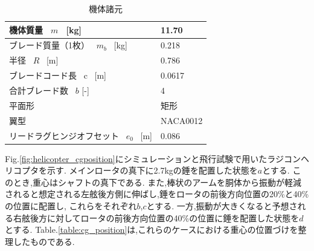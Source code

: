     \begin{table}[H]
        \centering
        \caption{機体諸元}
        \label{table:aircraft_specification}
        \setlength{\tabcolsep}{5pt}
        \begin{tabular}{|l|l|}
            \hline 機体質量 \, $m$ \, [kg] &  11.70 \\
            \hline ブレード質量（1枚） \, $m_b$ \, [kg] &  0.218 \\
            \hline 半径 \, $R$ \, [m] &  0.786 \\
            \hline ブレードコード長 \, c \, [m] & 0.0617 \\
            \hline 合計ブレード数 \, $b$ [-] & 4 \\
            \hline 平面形  & 矩形 \\
            \hline 翼型 & NACA0012 \\
           \hline  リードラグヒンジオフセット \, $e_0$ \, [m] & 0.086 \\
            \hline 
        \end{tabular}
    \end{table}

    \par
    Fig.\ref{fig:helicopter_cgposition}にシミュレーションと飛行試験で用いたラジコンヘリコプタを示す.
    メインロータの真下に2.7kgの錘を配置した状態を$a$とする.
    このとき,重心はシャフトの真下である.
    また,棒状のアームを胴体から振動が軽減されると想定される左舷後方側に伸ばし,錘をロータの前後方向位置の20\%と40\%の位置に配置し,
    これらをそれぞれ$b$,$c$とする.
    一方,振動が大きくなると予想される右舷後方に対してロータの前後方向位置の40\%の位置に錘を配置した状態を$d$とする.
    Table.\ref{table:cg_position}は,これらのケースにおける重心の位置づけを整理したものである.
  
  
  
